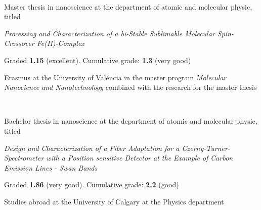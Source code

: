 \sectionsep

\\
\begin{tightemize}
\item Master thesis in nanoscience at the department of atomic and molecular physic, titled 

\textit{Processing and Characterization of a bi-Stable Sublimable Molecular Spin-Crossover Fe(II)-Complex}

Graded \textbf{1.15} (excellent). Cumulative grade: \textbf{1.3} (very good)
\end{tightemize}

\begin{tightemize}
\item Erasmus at the University of València in the master program \textit{Molecular Nanocience and Nanotechnology} combined with the research for the master thesis
\end{tightemize}

\sectionsep

\\
\begin{tightemize}
\item Bachelor thesis in nanoscience at the department of atomic and molecular physic, titled 

\textit{Design and Characterization of a Fiber Adaptation for a Czerny-Turner-Spectrometer with a Position sensitive Detector at the Example of Carbon Emission Lines - Swan Bands} 

Graded \textbf{1.86} (very good). Cumulative grade: \textbf{2.2} (good)
\end{tightemize}

\begin{tightemize}
\item Studies abroad at the University of Calgary at the Physics department
\end{tightemize}
\sectionsep

